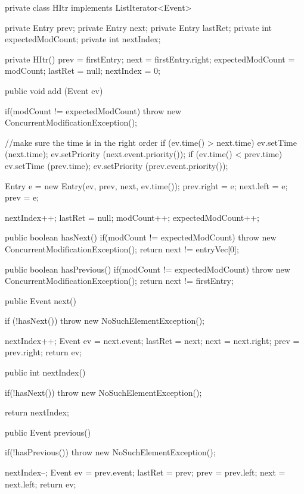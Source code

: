\begin{code}
\begin{hide}
{   private class HItr implements ListIterator<Event> {
      private Entry prev;
      private Entry next;
      private Entry lastRet;
      private int expectedModCount;
      private int nextIndex;

      private HItr() {
         prev = firstEntry;
         next = firstEntry.right;
         expectedModCount = modCount;
         lastRet = null;
         nextIndex = 0;
      }

      public void add (Event ev) {
         if(modCount != expectedModCount)
            throw new ConcurrentModificationException();

         //make sure the time is in the right order
         if (ev.time() > next.time) {
            ev.setTime (next.time);
            ev.setPriority (next.event.priority());
         }
         if (ev.time() < prev.time) {
            ev.setTime (prev.time);
            ev.setPriority (prev.event.priority());
         }

         Entry e = new Entry(ev, prev, next, ev.time());
         prev.right = e;
         next.left = e;
         prev = e;

         nextIndex++;
         lastRet = null;
         modCount++;
         expectedModCount++;
      }

      public boolean hasNext() {
         if(modCount != expectedModCount)
            throw new ConcurrentModificationException();
         return next != entryVec[0];
      }

      public boolean hasPrevious() {
         if(modCount != expectedModCount)
            throw new ConcurrentModificationException();
         return next != firstEntry;
      }

      public Event next() {
         if (!hasNext())
            throw new NoSuchElementException();

         nextIndex++;
         Event ev = next.event;
         lastRet = next;
         next = next.right;
         prev = prev.right;
         return ev;
      }

      public int nextIndex() {
         if(!hasNext())
            throw new NoSuchElementException();

         return nextIndex;
      }

      public Event previous() {
         if(!hasPrevious())
            throw new NoSuchElementException();

         nextIndex--;
         Event ev = prev.event;
         lastRet = prev;
         prev = prev.left;
         next = next.left;
         return ev;
      }

}}
\end{hide}
\end{code}
